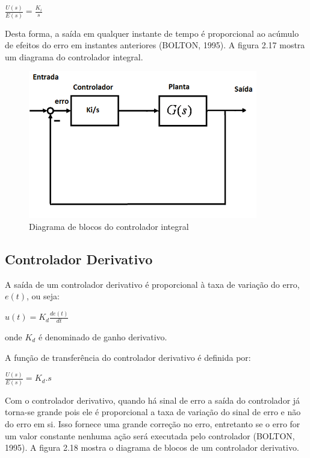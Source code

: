 \begin{center}
$ \frac{U(s)}{E(s)} = \frac{K_i}{s}$
\end{center}

\noindent Desta forma, a saída em qualquer instante de tempo é proporcional ao acúmulo de efeitos do erro em instantes anteriores (BOLTON, 1995). A figura 2.17 mostra um diagrama do controlador integral.


\begin{figure}[!htb]

\center

\includegraphics[width=10cm]{imagens/planta_integral.png}

\label{Diagrama de blocos do controlador integral}

\caption{Diagrama de blocos do controlador integral}

\end{figure}

\subsection{Controlador Derivativo}

A saída de um controlador derivativo é proporcional à taxa de variação do erro, $e(t)$, ou seja:

\begin{center}
$u(t) = K_d \frac{d e(t)}{dt}$

\end{center}
\noindent onde $K_d$ é denominado de ganho derivativo.

A função de transferência do controlador derivativo é definida por:

\begin{center}
$\frac{U(s)}{E(s)} = K_d.s$

\end{center}

Com  o controlador derivativo, quando há sinal de erro a saída do controlador já torna-se grande pois ele é proporcional a taxa de variação do sinal de erro e não do erro em si. Isso fornece uma grande correção no erro, entretanto se o erro for um valor constante nenhuma ação será executada pelo controlador (BOLTON, 1995). A figura 2.18  mostra o diagrama de blocos de um controlador derivativo.

